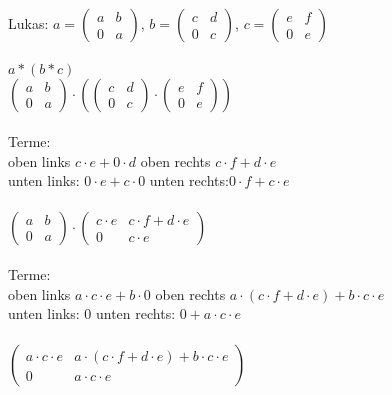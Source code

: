 \documentclass{scrartcl}
\begin{document}
\begin{enumerate}
\newpage
Lukas:
$a = \begin{pmatrix}
	a & b \\ 0 & a
\end{pmatrix}$, $b = \begin{pmatrix}
c & d \\ 0 & c
\end{pmatrix}$, $c = \begin{pmatrix}
e & f \\ 0 & e
\end{pmatrix}$\\\\
$a *( b * c)$\\
$\begin{pmatrix}
a & b \\ 0 & a
\end{pmatrix} \cdot ( \begin{pmatrix}
c & d \\ 0 & c
\end{pmatrix} \cdot \begin{pmatrix}
e & f \\ 0 & e
\end{pmatrix})$\\\\
Terme:\\
oben links $c \cdot e + 0 \cdot d$ \hspace{2cm}
oben rechts $c \cdot f + d \cdot e$\\
unten links: $0 \cdot e + c \cdot 0$ \hspace{2cm}
unten rechts:$ 0 \cdot f + c \cdot e$\\\\
$\begin{pmatrix}
a & b \\ 0 & a
\end{pmatrix} \cdot \begin{pmatrix}
c \cdot e & c \cdot f + d \cdot e \\ 0 & c \cdot e
\end{pmatrix}$\\\\
Terme:\\
oben links $ a\cdot c \cdot e + b \cdot 0$ \hspace{2cm}
oben rechts $a \cdot (c \cdot f + d \cdot e) + b \cdot c \cdot e $\\
unten links: $0$ \hspace{2cm}
unten rechts: $ 0 + a \cdot c \cdot e$\\\\
$\begin{pmatrix}
	a\cdot c \cdot e & a \cdot (c \cdot f + d \cdot e) + b \cdot c \cdot e \\ 0 & a \cdot c \cdot e
\end{pmatrix}$\\\\\\


\end{enumerate}
\end{document}
